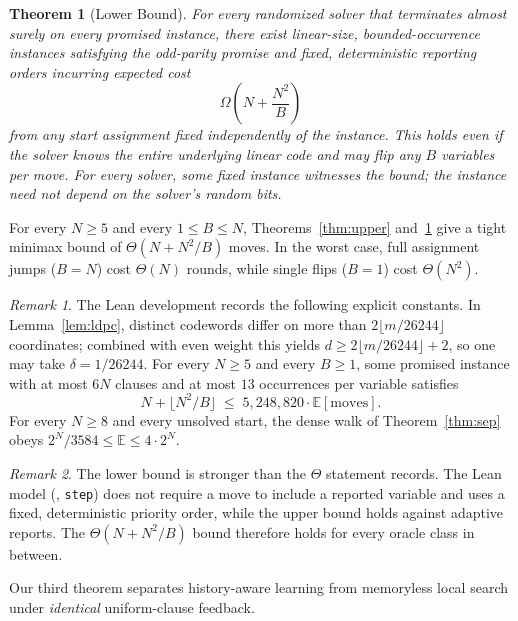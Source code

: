 \documentclass[11pt,a4paper]{article}
\newtheorem{theorem}{Theorem}[section]
\theoremstyle{definition}
\theoremstyle{remark}
\newtheorem*{plainremark}{Remark}
\newcommand{\E}{\mathbb{E}}
\begin{document}
\begin{theorem}[Lower Bound]\label{thm:lower}
For every randomized solver that terminates almost surely on every promised instance, there exist linear-size, bounded-occurrence instances satisfying the odd-parity promise and fixed, deterministic reporting orders incurring expected cost
\[
    \Omega\!\left(N + \frac{N^2}{B}\right)
\]
from any start assignment fixed independently of the instance.
This holds even if the solver knows the entire underlying linear code and may flip any $B$ variables per move. For every solver, some fixed instance witnesses the bound; the instance need not depend on the solver's random bits.
\end{theorem}

For every $N \ge 5$ and every $1\le B\le N$, Theorems~\ref{thm:upper} and~\ref{thm:lower} give a tight minimax bound of $\Theta(N + N^2/B)$ moves. In the worst case, full assignment jumps ($B=N$) cost $\Theta(N)$ rounds, while single flips ($B=1$) cost $\Theta(N^2)$.

\begin{plainremark}
The Lean development records the following explicit constants. In Lemma~\ref{lem:ldpc}, distinct codewords differ on more than $2\lfloor m/26244\rfloor$ coordinates; combined with even weight this yields $d \ge 2\lfloor m/26244\rfloor + 2$, so one may take $\delta = 1/26244$. For every $N \ge 5$ and every $B \ge 1$, some promised instance with at most $6N$ clauses and at most $13$ occurrences per variable satisfies
\[
  N + \bigl\lfloor N^2/B\bigr\rfloor \;\le\; 5{,}248{,}820 \cdot \E[\text{moves}].
\]
For every $N \ge 8$ and every unsolved start, the dense walk of Theorem~\ref{thm:sep} obeys $2^N/3584 \le \E \le 4\cdot 2^N$.
\end{plainremark}

\begin{plainremark}
The lower bound is stronger than the $\Theta$ statement records. The Lean model (, \texttt{step}) does not require a move to include a reported variable and uses a fixed, deterministic priority order, while the upper bound holds against adaptive reports. The $\Theta(N+N^2/B)$ bound therefore holds for every oracle class in between.
\end{plainremark}

Our third theorem separates history-aware learning from memoryless local search under \emph{identical} uniform-clause feedback.
\end{document}
